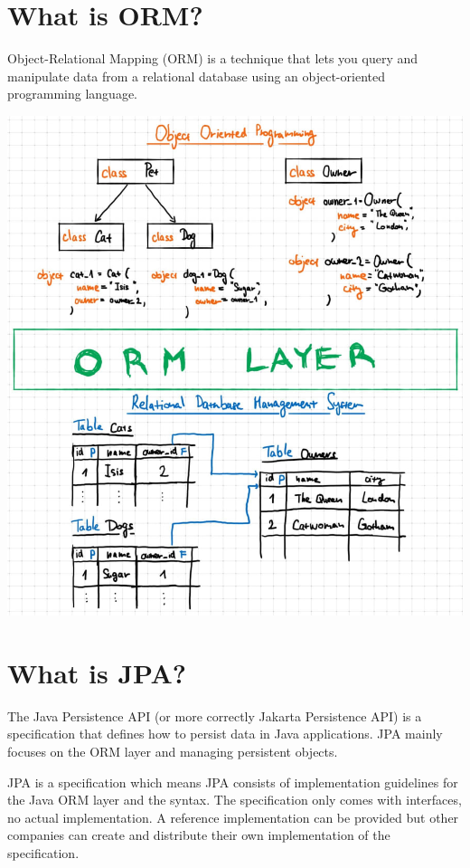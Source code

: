   
\section{What is ORM?}

Object-Relational Mapping (ORM) is a technique that lets you query and manipulate data from a relational database using an object-oriented programming language.

\includegraphics[width=\textwidth]{./images/chapter6/orm}


\section{What is JPA?}

The Java Persistence API (or more correctly Jakarta Persistence API) is a specification that defines how to persist data in Java applications. JPA mainly focuses on the ORM layer and managing persistent objects.

JPA is a specification which means JPA consists of implementation guidelines for the Java ORM layer and the syntax. The specification only comes with interfaces, no actual implementation.  A reference implementation can be provided but other companies can create and distribute their own implementation of the specification.

